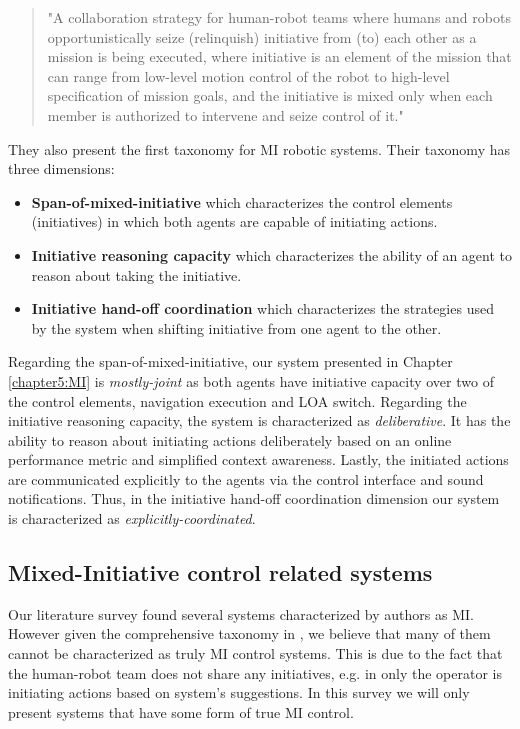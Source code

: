 \documentclass[a4paper,12pt,oneside,openright]{bhamthesis}
\begin{document}
\begin{quotation}
	"A collaboration strategy for human-robot teams where humans and robots opportunistically seize (relinquish) initiative from (to) each other as a mission is being executed, where initiative is an element of the mission that can range from low-level motion control of the robot to high-level specification of mission goals, and the initiative is mixed only when each member is authorized to intervene and seize control of it."
\end{quotation}

They also present the first taxonomy for MI robotic systems. Their taxonomy has three dimensions: 

\begin{itemize}
	\item \textbf{Span-of-mixed-initiative} which characterizes the control elements (initiatives) in which both agents are capable of initiating actions.
	
	\item \textbf{Initiative reasoning capacity} which characterizes the ability of an agent to reason about taking the initiative.
	
	\item \textbf{Initiative hand-off coordination} which characterizes the strategies used by the system when shifting initiative from one agent to the other.
\end{itemize}

Regarding the span-of-mixed-initiative, our system presented in Chapter \ref{chapter5:MI} is \textit{mostly-joint} as both agents have initiative capacity over two of the control elements, navigation execution and LOA switch. Regarding the initiative reasoning capacity, the system is characterized as \textit{deliberative}. It has the ability to reason about initiating actions deliberately based on an online performance metric and simplified context awareness. Lastly, the initiated actions are communicated explicitly to the agents via the control interface and sound notifications. Thus, in the initiative hand-off coordination dimension our system is characterized as \textit{explicitly-coordinated}.

\subsection{Mixed-Initiative control related systems}
\label{section:MI-systems}
Our literature survey found several systems characterized by authors as MI. However given the comprehensive taxonomy in \cite{Jiang2015}, we believe that many of them cannot be characterized as truly MI control systems. This is due to the fact that the human-robot team does not share any initiatives, e.g. in \cite{Finzi2005} only the operator is initiating actions based on system's suggestions. In this survey we will only present systems that have some form of true MI control.
\end{document}
